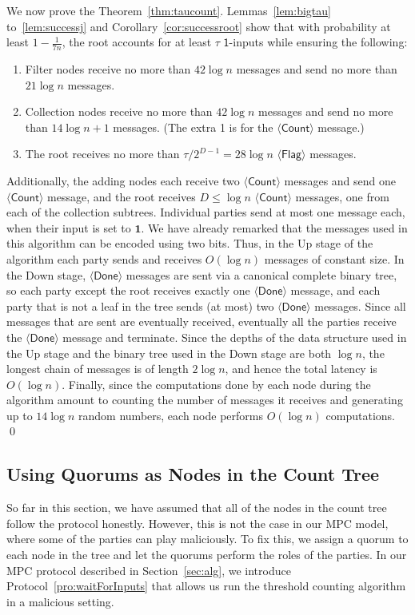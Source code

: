\documentclass[11pt,letter]{article}
\theoremstyle{mytheoremstyle}
\newcommand{\dcl}{D}
\newcommand{\flag}{$\langle\mathsf{Flag}\rangle$\xspace}
\newcommand{\countm}{$\langle\mathsf{Count}\rangle$\xspace}
\newcommand{\done}{$\langle\mathsf{Done}\rangle$\xspace}
\newcommand{\oneinputs}{$\mathsf{1}$-inputs\xspace}
\begin{document}
We now prove the Theorem~\ref{thm:taucount}.
Lemmas~\ref{lem:bigtau} to~\ref{lem:successj} and Corollary~\ref{cor:successroot} show that with probability at least $1- \frac{1}{7n}$, the root accounts for at least $\tau$ \oneinputs while ensuring the following:
\begin{enumerate}
	\item Filter nodes receive no more than $42\log{n}$ messages and send no more
	than $21\log{n}$ messages.
	\item Collection nodes receive no more than $42\log{n}$ messages and send
	no more than $14\log{n} + 1$ messages. (The extra 1 is for the \countm
	message.)
	\item The root receives no more than $\tau/2^{\dcl-1}= 28\log{n}$ \flag messages.
\end{enumerate}
Additionally, the adding nodes each receive two \countm messages and send one \countm message, and the root receives $\dcl \le \log{n}$ \countm messages, one from each of the collection subtrees.
Individual parties send at most one message each, when their input is set to $\mathbf{1}$. We have already remarked that the messages used in this algorithm can be encoded using two bits.
Thus, in the Up stage of the algorithm each party sends and receives  $O(\log{n})$ messages of constant size.
In the Down stage, \done messages are sent via a canonical complete binary tree, so each party except the root receives exactly one \done message, and each party that is not a leaf in the tree sends (at most) two \done messages.
Since all messages that are sent are eventually received, eventually all the parties receive the \done message and terminate.
Since the depths of the data structure used in the Up stage and the binary tree used in the Down stage are both $\log{n}$, the longest chain of messages is of length $2\log{n}$, and hence the total latency is $O(\log{n})$.
Finally, since the computations done by each node during the algorithm amount to counting the number of messages it receives and generating up to $14 \log{n}$ random numbers, each node performs $O(\log{n})$ computations.
\qed

\subsection{Using Quorums as Nodes in the Count Tree}
So far in this section, we have assumed that all of the nodes in the count tree follow the protocol honestly. However, this is not the case in our MPC model, where some of the parties can play maliciously. To fix this, we assign a quorum to each node in the tree and let the quorums perform the roles of the parties. In our MPC protocol described in Section~\ref{sec:alg}, we introduce Protocol~\ref{pro:waitForInputs} that allows us run the threshold counting algorithm in a malicious setting.
 
\end{document}
